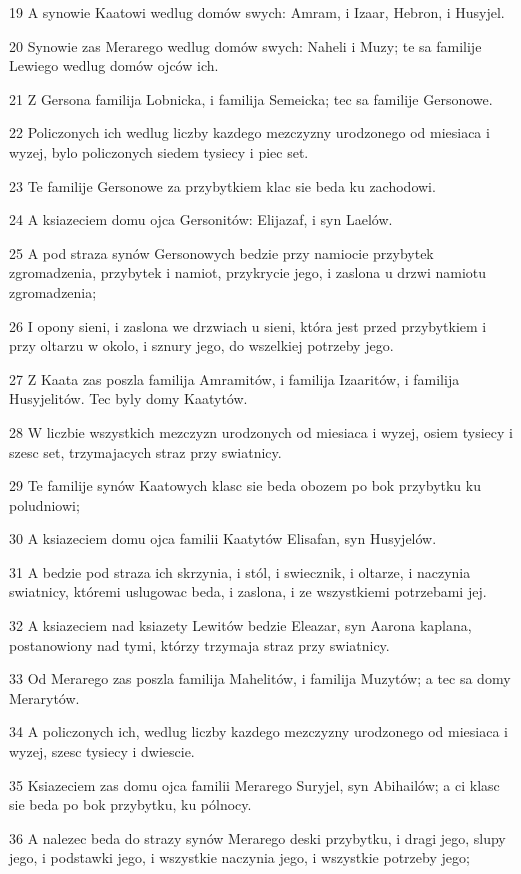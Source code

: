 \par 19 A synowie Kaatowi wedlug domów swych: Amram, i Izaar, Hebron, i Husyjel.
\par 20 Synowie zas Merarego wedlug domów swych: Naheli i Muzy; te sa familije Lewiego wedlug domów ojców ich.
\par 21 Z Gersona familija Lobnicka, i familija Semeicka; tec sa familije Gersonowe.
\par 22 Policzonych ich wedlug liczby kazdego mezczyzny urodzonego od miesiaca i wyzej, bylo policzonych siedem tysiecy i piec set.
\par 23 Te familije Gersonowe za przybytkiem klac sie beda ku zachodowi.
\par 24 A ksiazeciem domu ojca Gersonitów: Elijazaf, i syn Laelów.
\par 25 A pod straza synów Gersonowych bedzie przy namiocie przybytek zgromadzenia, przybytek i namiot, przykrycie jego, i zaslona u drzwi namiotu zgromadzenia;
\par 26 I opony sieni, i zaslona we drzwiach u sieni, która jest przed przybytkiem i przy oltarzu w okolo, i sznury jego, do wszelkiej potrzeby jego.
\par 27 Z Kaata zas poszla familija Amramitów, i familija Izaaritów, i familija Husyjelitów. Tec byly domy Kaatytów.
\par 28 W liczbie wszystkich mezczyzn urodzonych od miesiaca i wyzej, osiem tysiecy i szesc set, trzymajacych straz przy swiatnicy.
\par 29 Te familije synów Kaatowych klasc sie beda obozem po bok przybytku ku poludniowi;
\par 30 A ksiazeciem domu ojca familii Kaatytów Elisafan, syn Husyjelów.
\par 31 A bedzie pod straza ich skrzynia, i stól, i swiecznik, i oltarze, i naczynia swiatnicy, któremi uslugowac beda, i zaslona, i ze wszystkiemi potrzebami jej.
\par 32 A ksiazeciem nad ksiazety Lewitów bedzie Eleazar, syn Aarona kaplana, postanowiony nad tymi, którzy trzymaja straz przy swiatnicy.
\par 33 Od Merarego zas poszla familija Mahelitów, i familija Muzytów; a tec sa domy Merarytów.
\par 34 A policzonych ich, wedlug liczby kazdego mezczyzny urodzonego od miesiaca i wyzej, szesc tysiecy i dwiescie.
\par 35 Ksiazeciem zas domu ojca familii Merarego Suryjel, syn Abihailów; a ci klasc sie beda po bok przybytku, ku pólnocy.
\par 36 A nalezec beda do strazy synów Merarego deski przybytku, i dragi jego, slupy jego, i podstawki jego, i wszystkie naczynia jego, i wszystkie potrzeby jego;
